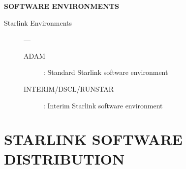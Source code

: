 \begin{center}
{\bf\large SOFTWARE ENVIRONMENTS}
\end{center}

\begin{description}

\item [Starlink Environments] ---
\begin{description}
\item [ADAM] : Standard Starlink software environment
\item [INTERIM/DSCL/RUNSTAR] : Interim Starlink software environment
\end{description}
\end{description}

\section {STARLINK SOFTWARE DISTRIBUTION}

